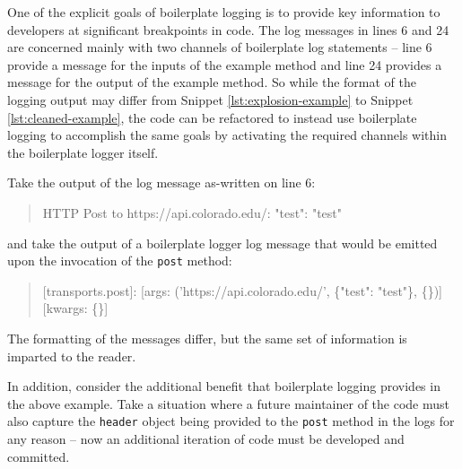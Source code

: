 \documentclass[acmsmall,review,authorversion]{acmart}
\begin{document}
    One of the explicit goals of boilerplate logging is to provide key information to developers at significant breakpoints in code. The log messages in lines 6 and 24 are concerned mainly with two channels of boilerplate log statements -- line 6 provide a message for the inputs of the example method and line 24 provides a message for the output of the example method. So while the format of the logging output may differ from Snippet \ref{lst:explosion-example} to Snippet \ref{lst:cleaned-example}, the code can be refactored to instead use boilerplate logging to accomplish the same goals by activating the required channels within the boilerplate logger itself.

    Take the output of the log message as-written on line 6:

    \begin{quote}
    HTTP Post to https://api.colorado.edu/: {"test": "test"}
    \end{quote}

    and take the output of a boilerplate logger log message that would be emitted upon the invocation of the \lstinline{post} method:

    \begin{quote}
        [transports.post]: [args: ('https://api.colorado.edu/', \{"test": "test"\}, \{\})] [kwargs: \{\}]
    \end{quote}

    The formatting of the messages differ, but the same set of information is imparted to the reader.

    In addition, consider the additional benefit that boilerplate logging provides in the above example. Take a situation where a future maintainer of the code must also capture the \lstinline{header} object being provided to the \lstinline{post} method in the logs for any reason -- now an additional iteration of code must be developed and committed.
\end{document}
